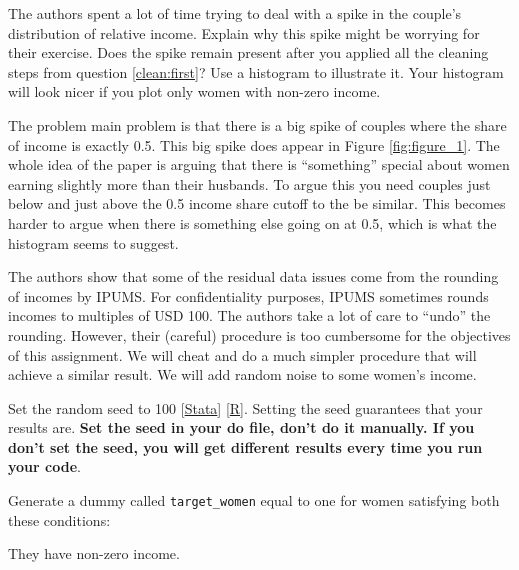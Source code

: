 \documentclass[a4paper, 11pt,addpoints]{exam}
\begin{document}
\begin{questions}
	
	
	\begin{solution}
		
	\end{solution}	
	
	\question[15] The authors spent a lot of time trying to deal with a spike in the couple's distribution of relative income. Explain why this spike might be worrying for their exercise. Does the spike remain present after you applied all the cleaning steps from question \ref{clean:first}? Use a histogram to illustrate it. Your histogram will look nicer if you plot only women with non-zero income.
	\begin{solution}
	The problem main problem is that there is a big spike of couples where the share of income is exactly 0.5.  This big spike does appear in Figure \ref{fig:figure_1}. The whole idea of the paper is arguing that there is ``something'' special about women earning slightly more than their husbands. To argue this you need couples just below and just above the 0.5 income share cutoff to the be similar. This becomes harder to argue when there is something else going on at 0.5, which is what the histogram seems to suggest. 
	
	\end{solution}
	\FloatBarrier
	\question[15] The authors show that some of the residual data issues come from the rounding of incomes by IPUMS. For confidentiality purposes, IPUMS sometimes rounds incomes to multiples of USD 100. The authors take a lot of care to ``undo'' the rounding. However, their (careful) procedure is too cumbersome for the objectives of this assignment. We will cheat and do a much simpler procedure that will achieve a similar result. We will add random noise to some women's income.
	\label{question:noise}
	\benu[label=(\alph*)]
		\item Set the random seed to 100 [\href{https://stats.oarc.ucla.edu/stata/faq/how-can-i-draw-a-random-sample-of-my-data/#:~:text=Setting%20the%20seed&text=The%20seed%20is%20the%20number,command%20followed%20by%20a%20number}{Stata}] [\href{https://r-coder.com/set-seed-r/}{R}]. Setting the seed guarantees that your results are. \textbf{Set the seed in your do file, don't do it manually. If you don't set the seed, you will get different results every time you run your code}.
		\item Generate a dummy called {\tt target\_women} equal to one for women satisfying both these conditions:
		\bitem 
			\item They have non-zero income.

\end{questions}
\end{document}
